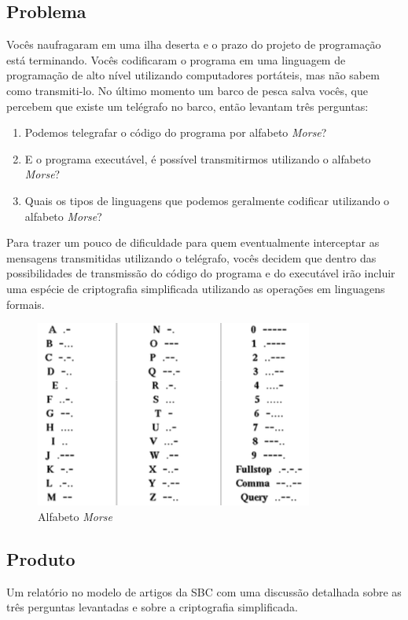 \subsection{Problema}
Vocês naufragaram em uma ilha deserta e o prazo do projeto de programação está terminando.
Vocês codificaram o programa em uma linguagem de programação de alto nível utilizando computadores
portáteis, mas não sabem como transmiti-lo.
No último momento um barco de pesca salva vocês, que percebem que existe um telégrafo no barco, então levantam três perguntas:
\begin{enumerate}
    \item Podemos telegrafar o código do programa por alfabeto \textit{Morse}?
    \item E o programa executável, é possível transmitirmos utilizando o alfabeto \textit{Morse}?
    \item Quais os tipos de linguagens que podemos geralmente codificar utilizando o alfabeto \textit{Morse}?
\end{enumerate}

Para trazer um pouco de dificuldade para quem eventualmente interceptar as mensagens transmitidas
utilizando o telégrafo, vocês decidem que dentro das possibilidades de transmissão do código do programa
e do executável irão incluir uma espécie de criptografia simplificada utilizando as operações
em linguagens formais.

\begin{figure}[!htb]
\centering
\includegraphics[scale=0.5]{apendice/problemas/problema1a/fig2.png}
\caption{Alfabeto \textit{Morse}}
\label{fig2}
\end{figure}

\subsection{Produto}
Um relatório no modelo de artigos da SBC com uma discussão detalhada sobre as três perguntas levantadas
e sobre a criptografia simplificada.
